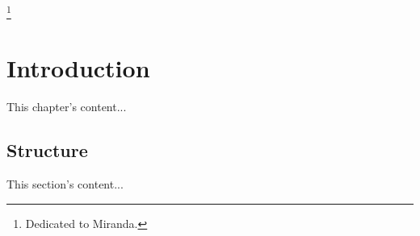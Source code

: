 \documentclass[b5paper,12pt,draft]{book}
\begin{document}
\thanks {Dedicated to Miranda.}
\clearpage



\chapter{Introduction}
This chapter's content...

\section{Structure}
This section's content...

\vfill

\listoffigures

\listoftables

\tableofcontents

\clearpage
\end{document}
